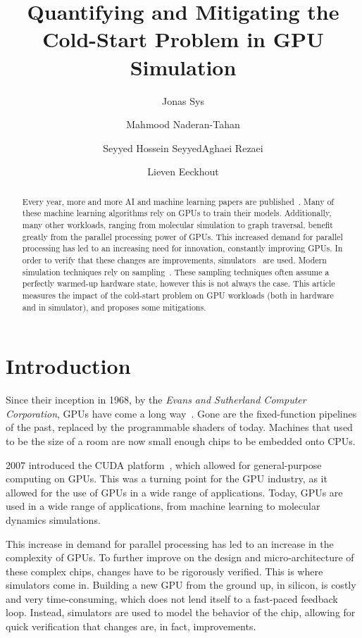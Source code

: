 \documentclass[5p,numvwe]{elsarticle}
\title{Quantifying and Mitigating the Cold-Start Problem in GPU Simulation}
\author{Jonas Sys \fnref{fn1}}
\author{Mahmood Naderan-Tahan \fnref{fn2}}
\author{Seyyed Hossein SeyyedAghaei Rezaei \fnref{fn2}}
\author{Lieven Eeckhout \fnref{fn2}}
\begin{document}
    \begin{abstract}
        Every year, more and more AI and machine learning papers are published~\cite{aiindex}.
        Many of these machine learning algorithms rely on GPUs to train their models.
        Additionally, many other workloads, ranging from molecular simulation to graph traversal, benefit greatly from the parallel processing power of GPUs.
        This increased demand for parallel processing has led to an increasing need for innovation, constantly improving GPUs.
        In order to verify that these changes are improvements, simulators~\cite{accelsim} are used.
        Modern simulation techniques rely on sampling~\cite{pks, sieve}.
        These sampling techniques often assume a perfectly warmed-up hardware state, however this is not always the case.
        This article measures the impact of the cold-start problem on GPU workloads (both in hardware and in simulator), and proposes some mitigations.
    \end{abstract}

    \maketitle

    \section{Introduction}\label{sec:introduction}
    Since their inception in 1968, by the \textit{Evans and Sutherland Computer Corporation}, GPUs have come a long way~\cite{gpu-evolution}.
    Gone are the fixed-function pipelines of the past, replaced by the programmable shaders of today.
    Machines that used to be the size of a room are now small enough chips to be embedded onto CPUs.

    2007 introduced the CUDA platform~\cite{cuda, cuda-prog}, which allowed for general-purpose computing on GPUs.
    This was a turning point for the GPU industry, as it allowed for the use of GPUs in a wide range of applications.
    Today, GPUs are used in a wide range of applications, from machine learning to molecular dynamics simulations.

    This increase in demand for parallel processing has led to an increase in the complexity of GPUs.
    To further improve on the design and micro-architecture of these complex chips, changes have to be rigorously verified.
    This is where simulators come in.
    Building a new GPU from the ground up, in silicon, is costly and very time-consuming, which does not lend itself to a fast-paced feedback loop.
    Instead, simulators are used to model the behavior of the chip, allowing for quick verification that changes are, in fact, improvements.
\end{document}

